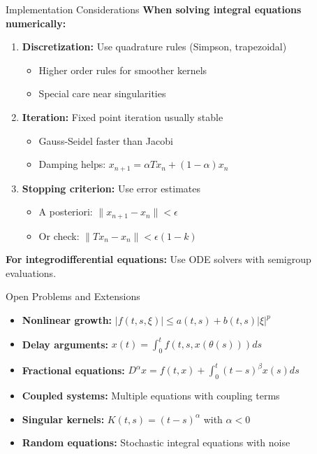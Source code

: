 \documentclass[aspectratio=169,10pt]{beamer}
\begin{document}
\begin{frame}[fragile]{Implementation Considerations}
\textbf{When solving integral equations numerically:}

\begin{enumerate}
    \item \textbf{Discretization:} Use quadrature rules (Simpson, trapezoidal)
    \begin{itemize}
        \item Higher order rules for smoother kernels
        \item Special care near singularities
    \end{itemize}

    \item \textbf{Iteration:} Fixed point iteration usually stable
    \begin{itemize}
        \item Gauss-Seidel faster than Jacobi
        \item Damping helps: $x_{n+1} = \alpha Tx_n + (1-\alpha)x_n$
    \end{itemize}

    \item \textbf{Stopping criterion:} Use error estimates
    \begin{itemize}
        \item A posteriori: $\|x_{n+1} - x_n\| < \epsilon$
        \item Or check: $\|Tx_n - x_n\| < \epsilon(1-k)$
    \end{itemize}
\end{enumerate}

\vspace{1em}
\textbf{For integrodifferential equations:} Use ODE solvers with semigroup evaluations.
\end{frame}

\begin{frame}{Open Problems and Extensions}
\begin{itemize}
    \item \textbf{Nonlinear growth:} $|f(t,s,\xi)| \leq a(t,s) + b(t,s)|\xi|^p$

    \item \textbf{Delay arguments:} $x(t) = \int_0^t f(t,s,x(\theta(s)))ds$

    \item \textbf{Fractional equations:} $D^\alpha x = f(t,x) + \int_0^t (t-s)^\beta x(s)ds$

    \item \textbf{Coupled systems:} Multiple equations with coupling terms

    \item \textbf{Singular kernels:} $K(t,s) = (t-s)^\alpha$ with $\alpha < 0$

    \item \textbf{Random equations:} Stochastic integral equations with noise
\end{itemize}

\vspace{1.5em}
\end{frame}
\end{document}
